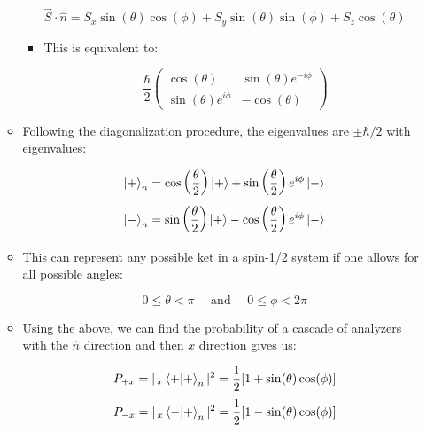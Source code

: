 \begin{itemize}
\begin{itemize}
        $$\vec{S}\cdot\hat{n}=S_x\sin(\theta)\cos(\phi)+S_y\sin(\theta)\sin(\phi)+S_z\cos(\theta)$$

        \begin{itemize}

          \item This is equivalent to:

            $$\frac{\hbar}{2}\left( \begin{matrix} \cos(\theta) & \sin(\theta)e^{-i\phi}\\ \sin(\theta)e^{i\phi} & -\cos(\theta)\end{matrix}\right)$$

        \end{itemize}

      \item Following the diagonalization procedure, the eigenvalues are $\pm\hbar/2$ with eigenvalues:

        $$\ket{+}_n=\cos\left( \frac{\theta}{2} \right)\ket{+}+\sin\left( \frac{\theta}{2} \right)e^{i\phi}\ket{-}$$
        $$\ket{-}_n=\sin\left( \frac{\theta}{2} \right)\ket{+}-\cos\left( \frac{\theta}{2} \right)e^{i\phi}\ket{-}$$

      \item This can represent any possible ket in a spin-1/2 system if one allows for all possible angles:

        $$0\leq\theta <\pi\quad\text{ and }\quad0\leq\phi< 2\pi$$

      \item Using the above, we can find the probability of a cascade of analyzers with the $\hat{n}$ direction and then $x$ direction gives us:

        $$P_{+x}=|\,_x\braket{+}_n|^2=\frac{1}{2}[1+\sin(\theta)\cos(\phi)]$$
        $$P_{-x}=|\,_x\bra{-}\ket{+}_n|^2=\frac{1}{2}[1-\sin(\theta)\cos(\phi)]$$

    \end{itemize}

\end{itemize}



